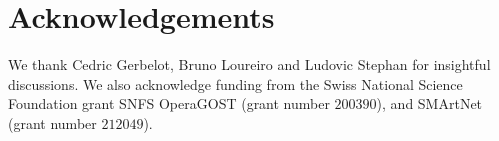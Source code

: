 \section*{Acknowledgements}

We thank Cedric Gerbelot, Bruno Loureiro and Ludovic Stephan for insightful discussions. We also acknowledge funding from the Swiss National Science Foundation grant SNFS OperaGOST  (grant number $200390$), and SMArtNet (grant number $212049$).
